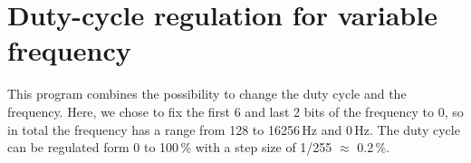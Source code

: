 \section{Duty-cycle regulation for variable frequency}

This program combines the possibility to change the duty cycle and the frequency. Here, we chose to fix the first 6 and last 2 bits of the frequency to 0, so in total the frequency has a range from 128 to 16256\,Hz and 0\,Hz. The duty cycle can be regulated form 0 to 100\,\% with a step size of 1/255 $\approx$ 0.2\,\%.





